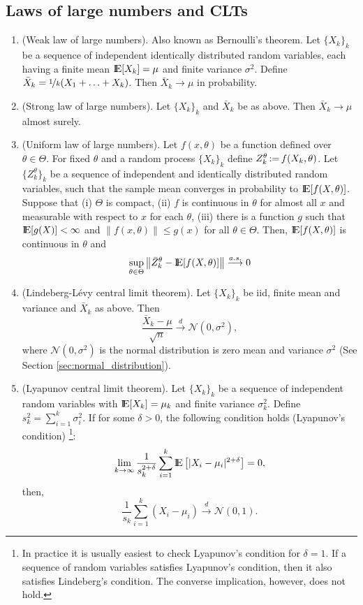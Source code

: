 \documentclass[a4paper,10pt]{scrbook}
\begin{document}
\subsection{Laws of large numbers and CLTs} 
\begin{enumerate}
  \item (Weak law of large numbers). Also known as Bernoulli's theorem. Let $\{X_k\}_k$ be
       a sequence of independent identically distributed random variables, each having a 
       finite mean $\E[X_k]=\mu$ and finite variance $\sigma^2$. Define 
       $\bar{X}_k=\nicefrac{1}{k}(X_1+\ldots+X_k)$. Then $\bar{X}_k\to \mu$ in probability.
   \item (Strong law of large numbers). Let $\{X_k\}_k$ and $\bar{X}_k$ be as above.
         Then $\bar{X}_k\to \mu$ almost surely.    
   \item (Uniform law of large numbers).  Let $f(x,\theta)$ be a function defined over
         $\theta\in\Theta$. For fixed $\theta$ and 
         a random process $\{X_k\}_k$ define $Z_k^\theta {}\mathop{\mathrel{:}=}{} f(X_k, \theta)$. Let 
         $\{Z_k^\theta\}_k$ be a sequence of independent and identically distributed 
         random variables, such that the sample mean converges in probability to $\E[f(X, \theta)]$. 
         Suppose that (i) $\Theta$ is compact, (ii) $f$ is continuous 
         in $\theta$ for almost all $x$ and measurable with respect to $x$ for each $\theta$,
         (iii) there is a function $g$ such that $\E[g(X)]<\infty$ and $\|f(x,\theta)\| \leq g(x)$ 
         for all $\theta\in\Theta$. Then, $\E[f(X,\theta)]$ is continuous in $\theta$ and
         \[
          \sup_{\theta\in\Theta}\left\| 
	    \bar{Z}^\theta_k - \E[f(X,\theta)] 
          \right\|
          \overset{a.s.}{\longrightarrow} 0
         \]

   \item (Lindeberg-L{\'e}vy central limit theorem). Let $\{X_k\}_k$ be iid, finite mean and variance 
         and $\bar{X}_k$ as above. Then
         \[
          \frac{\bar{X}_k-\mu}{\sqrt{n}} \overset{d}{\longrightarrow} \mathcal{N}(0, \sigma^2),
         \]
         where \(\mathcal{N}(0, \sigma^2)\) is the normal distribution is zero mean and variance \(\sigma^2\)
         (See Section \ref{sec:normal_distribution}).

   \item (Lyapunov central limit theorem). Let $\{X_k\}_k$ be a sequence of independent random variables
         with $\E[X_k]=\mu_k$ and finite variance $\sigma_k^2$. Define $s_k^2 = \sum_{i=1}^{k}\sigma_i^2$.
         If for some $\delta>0$, the following condition holds (Lyapunov's condition)%
         \footnote{In practice it is usually easiest to check Lyapunov's condition for $\delta=1$. 
                   If a sequence of random variables satisfies Lyapunov's condition, then it also 
                   satisfies Lindeberg's condition. The converse implication, however, does not hold.}:
         \[
          \lim_{k\to\infty} \frac{1}{s_k^{2+\delta}}\sum_{i=1}^{k}\E\left[ 
          |X_i - \mu_i|^{2+\delta}
          \right]=0,
         \]
	 then,
	 \[
	  \frac{1}{s_k}\sum_{i=1}^{k}(X_i - \mu_i) \overset{d}{\longrightarrow} \mathcal{N}(0, 1).
	 \]


\end{enumerate}
\end{document}
